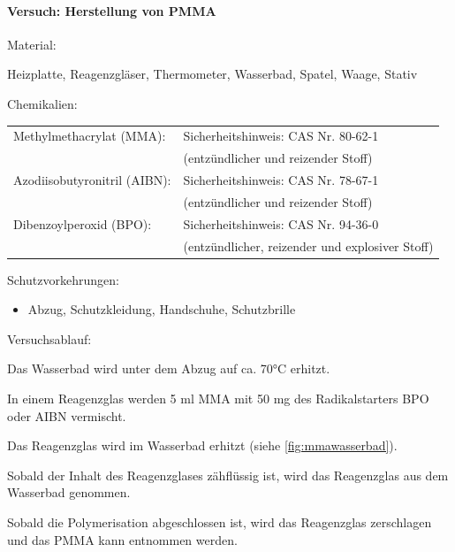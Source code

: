 \paragraph{Versuch: Herstellung von PMMA}

Material:
\begin{itemize*}
    \item Heizplatte, Reagenzgläser, Thermometer, Wasserbad, Spatel, Waage, Stativ
    \item Chemikalien: \\
    \begin{xtabular}{ll}
    Methylmethacrylat (MMA): & Sicherheitshinweis: CAS Nr. 80-62-1 \\
    & (entzündlicher und reizender Stoff) \\
    Azodiisobutyronitril (AIBN): & Sicherheitshinweis: CAS Nr. 78-67-1 \\
    & (entzündlicher und reizender Stoff) \\
    Dibenzoylperoxid (BPO): & Sicherheitshinweis: CAS Nr. 94-36-0 \\
    & (entzündlicher, reizender und explosiver Stoff)
    \end{xtabular}
\end{itemize*}

Schutzvorkehrungen:
\begin{itemize}
    \item Abzug, Schutzkleidung, Handschuhe, Schutzbrille
\end{itemize}

Versuchsablauf:
\begin{enumerate*}
    \item Das Wasserbad wird unter dem Abzug auf ca. 70°C erhitzt.
    \item In einem Reagenzglas werden 5 ml MMA mit 50 mg des Radikalstarters BPO oder AIBN vermischt.
    \item Das Reagenzglas wird im Wasserbad erhitzt (siehe \autoref{fig:mmawasserbad}).
    \item Sobald der Inhalt des Reagenzglases zähflüssig ist, wird das Reagenzglas aus dem Wasserbad genommen.
    \item Sobald die Polymerisation abgeschlossen ist, wird das Reagenzglas zerschlagen und das PMMA kann entnommen werden.
\end{enumerate*}

